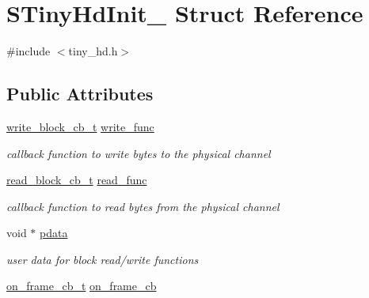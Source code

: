 \hypertarget{structSTinyHdInit__}{}\section{S\+Tiny\+Hd\+Init\+\_\+ Struct Reference}
\label{structSTinyHdInit__}


{\ttfamily \#include $<$tiny\+\_\+hd.\+h$>$}

\subsection*{Public Attributes}
\begin{DoxyCompactItemize}
\item 
\mbox{\label{structSTinyHdInit___a0bd05a4fc43236ff37d67aec4d2a0952}} 
\hyperlink{tiny__proto__types_8h_aafd634660bba76cace57a8f9b01e044d}{write\+\_\+block\+\_\+cb\+\_\+t} \hyperlink{structSTinyHdInit___a0bd05a4fc43236ff37d67aec4d2a0952}{write\+\_\+func}
\begin{DoxyCompactList}\small\item\em callback function to write bytes to the physical channel \end{DoxyCompactList}\item 
\mbox{\label{structSTinyHdInit___a5de352b11ca7915737bc459cde7c566d}} 
\hyperlink{tiny__proto__types_8h_a15bec127d9ee63658563d62e92b5261b}{read\+\_\+block\+\_\+cb\+\_\+t} \hyperlink{structSTinyHdInit___a5de352b11ca7915737bc459cde7c566d}{read\+\_\+func}
\begin{DoxyCompactList}\small\item\em callback function to read bytes from the physical channel \end{DoxyCompactList}\item 
\mbox{\label{structSTinyHdInit___a7b6be4e09ea04eaa4372eadce4d51055}} 
void $\ast$ \hyperlink{structSTinyHdInit___a7b6be4e09ea04eaa4372eadce4d51055}{pdata}
\begin{DoxyCompactList}\small\item\em user data for block read/write functions \end{DoxyCompactList}\item 
\mbox{\label{structSTinyHdInit___ae2eea5181620dfbb47b60a5073bd5ed2}} 
\hyperlink{tiny__proto__types_8h_ad6bf709565b8aecb9e6ecf196f219d54}{on\+\_\+frame\+\_\+cb\+\_\+t} \hyperlink{structSTinyHdInit___ae2eea5181620dfbb47b60a5073bd5ed2}{on\+\_\+frame\+\_\+cb}

\end{DoxyCompactItemize}

